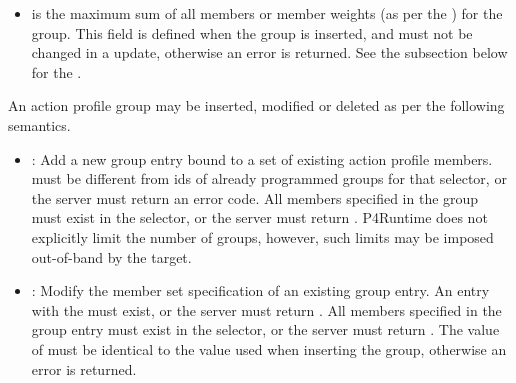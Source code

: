 \documentclass[11pt]{article}
\begin{document}
{\begin{itemize}
\item{}
 is the maximum sum of all members or member weights (as per the
) for the group. This field is defined when the group
is inserted, and must not be changed in a  update, otherwise an
 error is returned. See the subsection below for the
.%
\end{itemize}%

\noindent{}An action profile group may be inserted, modified or deleted as per the
following semantics.%

\begin{itemize}[noitemsep,topsep=\mdcompacttopsep]%

\item{}: Add a new group entry bound to a set of existing action profile
members.  must be different from ids of already programmed
groups for that selector, or the server must return an  error
code.  All members specified in the group must exist in the selector, or the
server must return . P4Runtime does not explicitly limit the number
of groups, however, such limits may be imposed out-of-band by the target.%

\item{}: Modify the member set specification of an existing group entry. An
entry with the  must exist, or the server must return
. All members specified in the group entry must exist in the
selector, or the server must return . The value of  must
be identical to the value used when inserting the group, otherwise an
 error is returned.%


\end{itemize}}
\end{document}
